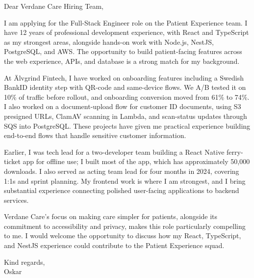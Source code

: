 \documentclass[11pt,a4paper]{article}
\begin{document}
Dear Verdane Care Hiring Team,

I am applying for the Full-Stack Engineer role on the Patient Experience team. I have 12 years of professional development experience, with React and TypeScript as my strongest areas, alongside hands-on work with Node.js, NestJS, PostgreSQL, and AWS. The opportunity to build patient-facing features across the web experience, APIs, and database is a strong match for my background.

At Älvgrind Fintech, I have worked on onboarding features including a Swedish BankID identity step with QR-code and same-device flows. We A/B tested it on 10\% of traffic before rollout, and onboarding conversion moved from 61\% to 74\%. I also worked on a document-upload flow for customer ID documents, using S3 presigned URLs, ClamAV scanning in Lambda, and scan-status updates through SQS into PostgreSQL. These projects have given me practical experience building end-to-end flows that handle sensitive customer information.

Earlier, I was tech lead for a two-developer team building a React Native ferry-ticket app for offline use; I built most of the app, which has approximately 50,000 downloads. I also served as acting team lead for four months in 2024, covering 1:1s and sprint planning. My frontend work is where I am strongest, and I bring substantial experience connecting polished user-facing applications to backend services.

Verdane Care’s focus on making care simpler for patients, alongside its commitment to accessibility and privacy, makes this role particularly compelling to me. I would welcome the opportunity to discuss how my React, TypeScript, and NestJS experience could contribute to the Patient Experience squad.

Kind regards,\\
Oskar
\end{document}
